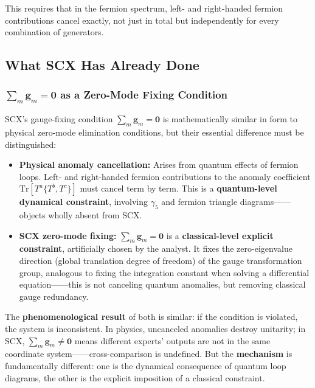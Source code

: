 \documentclass[12pt,a4paper]{article}
\theoremstyle{remark}
\newcommand{\Tr}{\mathrm{Tr}}
\newcommand{\gaugeparam}{\mathbf{g}}
\begin{document}
This requires that in the fermion spectrum, left- and right-handed fermion
contributions cancel exactly, not just in total but independently for every
combination of generators.

\subsection{What SCX Has Already Done}

\subsubsection{$\sum_m \gaugeparam_m = \mathbf{0}$ as a Zero-Mode Fixing Condition}

SCX's gauge-fixing condition $\sum_m \gaugeparam_m = \mathbf{0}$ is mathematically similar in form to
physical zero-mode elimination conditions, but their essential difference must be distinguished:

\begin{itemize}
    \item \textbf{Physical anomaly cancellation:} Arises from quantum effects of fermion loops.
    Left- and right-handed fermion contributions to the anomaly coefficient $\Tr[T^a\{T^b,T^c\}]$ must cancel term by term.
    This is a \textbf{quantum-level dynamical constraint}, involving $\gamma_5$ and fermion triangle diagrams——
    objects wholly absent from SCX.
    \item \textbf{SCX zero-mode fixing:} $\sum_m \gaugeparam_m = \mathbf{0}$ is a
    \textbf{classical-level explicit constraint}, artificially chosen by the analyst.
    It fixes the zero-eigenvalue direction (global translation degree of freedom) of the gauge transformation group,
    analogous to fixing the integration constant when solving a differential equation——this is not canceling quantum anomalies,
    but removing classical gauge redundancy.
\end{itemize}

The \textbf{phenomenological result} of both is similar: if the condition is violated, the system is inconsistent.
In physics, uncanceled anomalies destroy unitarity; in SCX, $\sum_m \gaugeparam_m \neq \mathbf{0}$
means different experts' outputs are not in the same coordinate system——cross-comparison is undefined.
But the \textbf{mechanism} is fundamentally different: one is the dynamical consequence of quantum loop diagrams, the other is the explicit imposition of a classical constraint.
\end{document}
